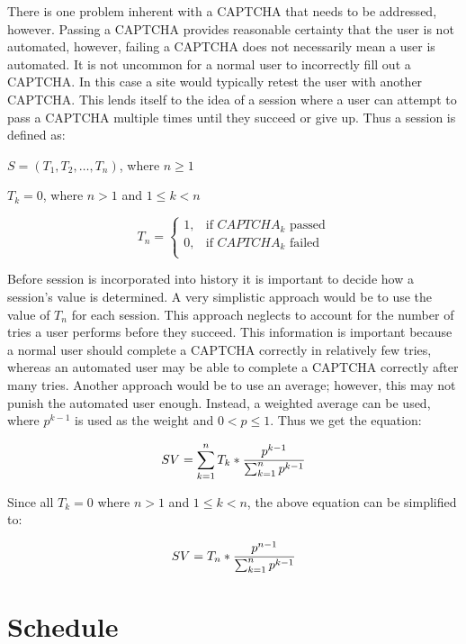 \documentclass[journal, 12pt, onecolumn, draftclsnofoot]{IEEEtran}
\begin{document}
There is one problem inherent with a CAPTCHA that needs to be addressed, however. Passing a CAPTCHA provides reasonable certainty that the user is not automated, however, failing a CAPTCHA does not necessarily mean a user is automated. It is not uncommon for a normal user to incorrectly fill out a CAPTCHA. In this case a site would typically retest the user with another CAPTCHA. This lends itself to the idea of a session where a user can attempt to pass a CAPTCHA multiple times until they succeed or give up. Thus a session is defined as:

$S=(T_1,T_2,\ldots,T_n )$, where $n \geq 1$

$T_k = 0$, where $n > 1$ and $1 \leq k < n$

\[
T_n =
  \begin{cases}
    1, &\text{if $CAPTCHA_k$ passed}\\
    0, &\text{if $CAPTCHA_k$ failed}\\
  \end{cases}
\]

Before session is incorporated into history it is important to decide how a session’s value is determined. A very simplistic approach would be to use the value of $T_n$ for each session. This approach neglects to account for the number of tries a user performs before they succeed. This information is important because a normal user should complete a CAPTCHA correctly in relatively few tries, whereas an automated user may be able to complete a CAPTCHA correctly after many tries. Another approach would be to use an average; however, this may not punish the automated user enough. Instead, a weighted average can be used, where $p^{k-1}$ is used as the weight and $0 < p \leq 1$. Thus we get the equation:

\[
  SV =
    \sum_{k=1}^n T_k * {
      p^{k-1} \over \sum_{k=1}^n p^{k-1}
    }
\]

  Since all $T_k = 0$ where $n > 1$ and $1 \leq k < n$, the above equation can be simplified to:

\[
  SV =
    T_n * {
      p^{n - 1} \over \sum_{k=1}^n p^{k-1}
    }
\]

\newpage




\newpage

\section{Schedule}
\end{document}
